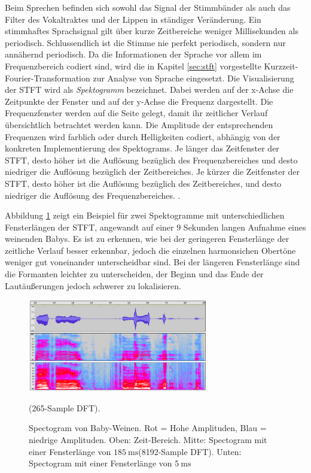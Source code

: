 Beim Sprechen befinden sich sowohl das Signal der Stimmbänder als auch das Filter des Vokaltraktes und der Lippen in ständiger Veränderung. Ein stimmhaftes Sprachsignal gilt über kurze Zeitbereiche weniger Millisekunden als periodisch. Schlussendlich ist die Stimme nie perfekt periodisch, sondern nur annähernd periodisch. Da die Informationen der Sprache vor allem im Frequenzbereich codiert sind, wird die in Kapitel \ref{sec:stft} vorgestellte Kurzzeit-Fourier-Transformation zur Analyse von Sprache eingesetzt. Die Visualisierung der STFT wird als \emph{Spektogramm} bezeichnet. Dabei werden auf der x-Achse die Zeitpunkte der Fenster und auf der y-Achse die Frequenz dargestellt. Die Frequenzfenster werden \glqq auf die Seite gelegt\grqq{}, damit ihr zeitlicher Verlauf übersichtlich betrachtet werden kann. Die Amplitude der entsprechenden Frequenzen wird farblich oder durch Helligkeiten codiert, abhängig von der konkreten Implementierung des Spektograms. Je länger das Zeitfenster der STFT, desto höher ist die Auflösung bezüglich des Frequenzbereiches und desto niedriger die Auflösung bezüglich der Zeitbereiches. Je kürzer die Zeitfenster der STFT, desto höher ist die Auflösung bezüglich des Zeitbereiches, und desto niedriger die Auflösung des Frequenzbereiches.\cite[S. 45 - 50]{sprachverarbeitung} \cite[Acoustic Representations of Speech]{speechAcoustics}. 

Abbildung \ref{img:spectoExample} zeigt ein Beispiel für zwei Spektogramme mit unterschiedlichen Fensterlängen der STFT, angewandt auf einer 9 Sekunden langen Aufnahme eines weinenden Babys. Es ist zu erkennen, wie bei der geringeren Fensterlänge der zeitliche Verlauf besser erkennbar, jedoch die einzelnen harmonsichen Obertöne weniger gut voneinander unterscheidbar sind. Bei der längeren Fensterlänge sind die Formanten leichter zu unterscheiden, der Beginn und das Ende der Lautäußerungen jedoch schwerer zu lokalisieren.

\begin{figure}[h]
	\centering
	\includegraphics[width=0.7\textwidth]{bilder/spectogram03.png}
	\caption{Spectogram von Baby-Weinen. Rot = Hohe Amplituden, Blau = niedrige Amplituden. Oben: Zeit-Bereich. Mitte: Spectogram mit einer Fensterlänge von $\SI{185}{\milli\second}$(8192-Sample DFT). Unten: Spectogram mit einer Fensterlänge von $\SI{5}{\milli\second}$} (265-Sample DFT).
	\label{img:spectoExample}
\end{figure}	

